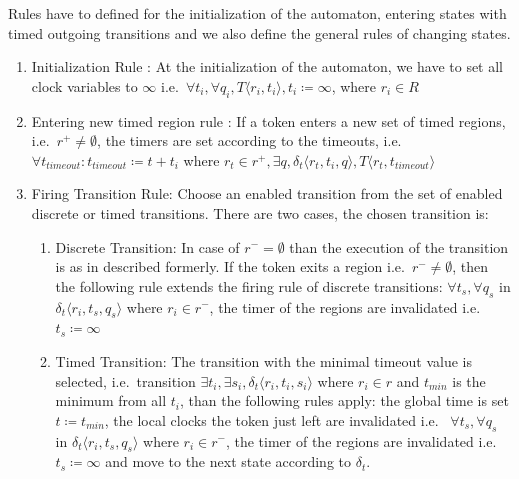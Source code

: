 		
		
		Rules  have to defined for the initialization of the automaton,
		entering states with timed outgoing transitions 
		and we also define the general rules of changing states. 
		
		\begin{enumerate}
			\item Initialization Rule : At the initialization  of the automaton, we have to set all clock variables to $\infty$ 
			i.e.~$\forall t_i, \forall q_i, T \langle r_i, t_i \rangle, t_i \coloneqq \infty $, where $r_i \in R$
			
			\item Entering new timed region rule :
			If a token enters a new set of timed regions, 
			i.e.~$r^+ \neq \emptyset$, 
			the timers are set according to the timeouts, 
			i.e.~$\forall t_{\textit{timeout}} : t_{\textit{timeout}} \coloneqq t + t_i $ where $ r_t \in r^+, \exists q ,\delta_t\langle  r_t,t_i,q \rangle, T \langle r_t, t_{\textit{timeout}} \rangle$
			
			\item Firing Transition Rule: Choose an enabled transition from the set of enabled discrete or timed transitions. 
			There are two cases, the chosen transition is:
			\begin{enumerate}
				\item Discrete Transition: In case of $r^- = \emptyset$ than the execution of the transition is as in described formerly. 
				If the token exits a region i.e.~$r^- \neq \emptyset$, 
				then the following rule extends the firing rule of discrete transitions:
				$\forall t_s, \forall q_s$ in $ \delta_t \langle r_i, t_s, q_s \rangle$ where $r_i \in r^-$, the timer of the regions are invalidated i.e.~	$t_s \coloneqq \infty$
				\item Timed Transition: The transition with the minimal timeout value is selected, 
				i.e.~transition $\exists t_i, \exists s_i, \delta_t \langle r_i, t_i, s_i \rangle$ where $ r_i \in r$ and $t_{\textit{min}}$ is the minimum from all $t_i$,
				than the following rules apply:
				the global time is set $t \coloneqq t_{\textit{min}}$, 
				the local clocks the token just left are invalidated i.e.~
				$\forall t_s, \forall q_s$ in $ \delta_t \langle r_i, t_s, q_s \rangle$ where $r_i \in r^-$, the timer of the regions are invalidated i.e.~$t_s \coloneqq \infty$ 
				and move to the next state according to $\delta_t$.
			\end{enumerate}			
		\end{enumerate}
		
